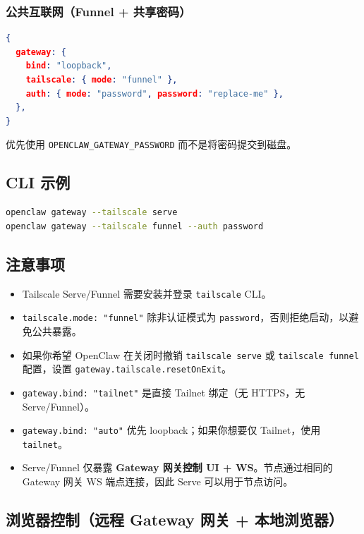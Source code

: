 \subsubsection{公共互联网（Funnel + 共享密码）}


\begin{lstlisting}[language=json]
{
  gateway: {
    bind: "loopback",
    tailscale: { mode: "funnel" },
    auth: { mode: "password", password: "replace-me" },
  },
}
\end{lstlisting}


优先使用 \texttt{OPENCLAW\_GATEWAY\_PASSWORD} 而不是将密码提交到磁盘。

\subsection{CLI 示例}


\begin{lstlisting}[language=bash]
openclaw gateway --tailscale serve
openclaw gateway --tailscale funnel --auth password
\end{lstlisting}


\subsection{注意事项}


\begin{itemize}
  \item Tailscale Serve/Funnel 需要安装并登录 \texttt{tailscale} CLI。
  \item \texttt{tailscale.mode: "funnel"} 除非认证模式为 \texttt{password}，否则拒绝启动，以避免公共暴露。
  \item 如果你希望 OpenClaw 在关闭时撤销 \texttt{tailscale serve} 或 \texttt{tailscale funnel} 配置，设置 \texttt{gateway.tailscale.resetOnExit}。
  \item \texttt{gateway.bind: "tailnet"} 是直接 Tailnet 绑定（无 HTTPS，无 Serve/Funnel）。
  \item \texttt{gateway.bind: "auto"} 优先 loopback；如果你想要仅 Tailnet，使用 \texttt{tailnet}。
  \item Serve/Funnel 仅暴露 \textbf{Gateway 网关控制 UI + WS}。节点通过相同的 Gateway 网关 WS 端点连接，因此 Serve 可以用于节点访问。
\end{itemize}


\subsection{浏览器控制（远程 Gateway 网关 + 本地浏览器）}


